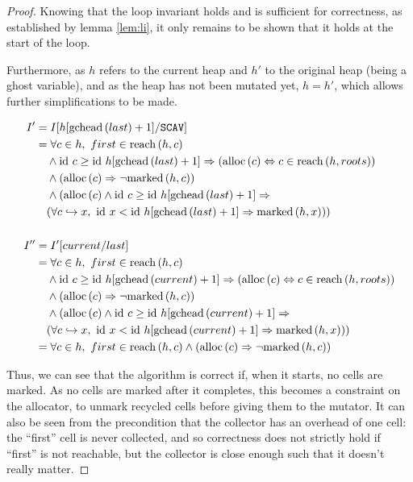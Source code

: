 \begin{proof}
  Knowing that the loop invariant holds and is sufficient for
  correctness, as established by lemma \ref{lem:li}, it only remains
  to be shown that it holds at the start of the loop.

  \begin{prooftree}
  \end{prooftree}

Furthermore, as $h$ refers to the current heap and $h'$ to the
original heap (being a ghost variable), and as the heap has not been
mutated yet, $h = h'$, which allows further simplifications to be made.

  \begin{align*}
    I' &= I[h[\gchead{last} + 1] / \mathtt{SCAV}]\\
%
    &= \forall c \in h,\ first \in \reach{h}{c}\\
    &\quad\land \id~c \geq \id~h[\gchead{last} + 1] \implies
    (\alloc{c} \iff c \in \reach{h}{roots})\\
    &\quad\land (\alloc{c} \implies \lnot \marked{h}{c})\\
    &\quad\land (\alloc{c} \land \id~c \geq \id~h[\gchead{last}+1] \implies\\
    &\quad(\forall c \pointsto x,\ \id~x < \id~h[\gchead{last} + 1]
    \implies \marked{h}{x}))\\\\
%
    I'' &= I'[current / last]\\
    &= \forall c \in h,\ first \in \reach{h}{c}\\
    &\quad\land \id~c \geq \id~h[\gchead{current} + 1] \implies
    (\alloc{c} \iff c \in \reach{h}{roots})\\
    &\quad\land (\alloc{c} \implies \lnot
    \marked{h}{c})\\
    &\quad\land (\alloc{c} \land \id~c \geq \id~h[\gchead{current}+1]
    \implies\\
    &\quad(\forall c \pointsto x,\ \id~x < \id~h[\gchead{current} + 1]
    \implies \marked{h}{x}))\\
%
    &= \forall c \in h,\ first \in \reach{h}{c} \land (\alloc{c}
    \implies \lnot \marked{h}{c})
  \end{align*}

  Thus, we can see that the algorithm is correct if, when it starts,
  no \glspl{cell} are marked. As no \glspl{cell} are marked after it
  completes, this becomes a constraint on the allocator, to unmark
  recycled \glspl{cell} before giving them to the
  \gls{mutator}. It can also be seen from the precondition that the
  \gls{collector} has an overhead of one \gls{cell}: the ``first''
  \gls{cell} is never collected, and so correctness does not strictly
  hold if ``first'' is not reachable, but the \gls{collector} is close
  enough such that it doesn't really matter.
\end{proof}

